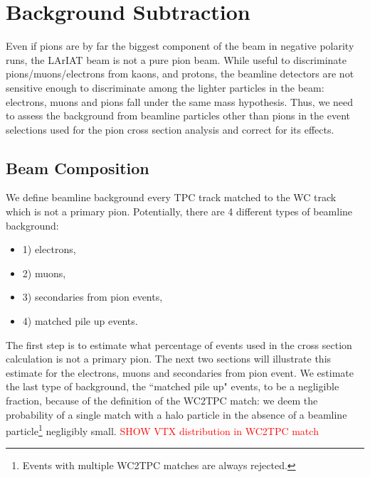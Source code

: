 \section{Background Subtraction }\label{sec:beamCont}
Even if pions are by far the biggest component of the beam in negative polarity runs, the LArIAT beam is not a pure pion beam. While useful to discriminate  pions/muons/electrons from kaons, and protons, the beamline detectors are not sensitive enough to  discriminate among the lighter particles in the beam: electrons, muons and pions fall under the same mass hypothesis. Thus, we need to assess the background from beamline particles other than pions in the event selections used for the pion cross section analysis and correct for its effects.

\subsection{Beam Composition}\label{sec:BeamAtWC4}
We define beamline background every TPC track matched to the WC track which is not a primary pion. Potentially, there are 4 different types of beamline background:
\begin{itemize}
\item[]1) electrons,
\item[]2) muons,
\item[]3) secondaries from pion events,
\item[]4) matched pile up events.
\end{itemize}

The first step is to estimate what percentage of events used in the cross section calculation is not a primary pion.  The next two sections will illustrate this estimate for the electrons, muons and secondaries from pion event.
We estimate the last type of background, the ``matched pile up" events, to be a negligible fraction, because of the definition of the WC2TPC match: we deem the probability of a single match with a halo particle in the absence of a beamline particle\footnote{ Events with multiple WC2TPC matches are always rejected.} negligibly small. \textcolor{red}{SHOW VTX distribution in WC2TPC match}


